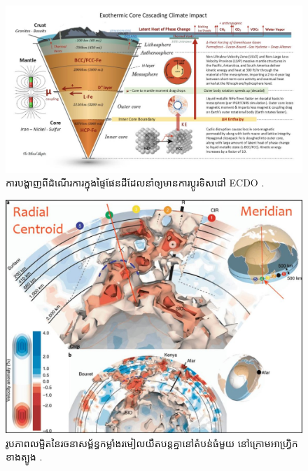 \documentclass[10pt,twocolumn,letterpaper]{article}
\begin{document}
\begin{figure}[t]
\begin{center}
\includegraphics[width=1\textwidth]{layers.jpg}
\end{center}
   \caption{ការបង្ហាញពីដំណើរការ​ក្នុងផ្ទៃផែនដី​ដែលនាំឲ្យមានការប្ដូរទិសដៅ ECDO \cite{129}.}
\label{fig:11}
\end{figure}


\begin{figure}[t]
\begin{center}
   \includegraphics[width=1\linewidth]{llvp.jpg}
\end{center}
   \caption{រូបភាពលម្អិតនៃរចនាសម្ព័ន្ធកម្លាំងរមៀលយឺតបន្តគ្នានៅតំបន់ធំមួយ នៅក្រោមអាហ្វ្រិកខាងត្បូង \cite{28}.}
\label{fig:12}
\label{fig:onecol}
\end{figure}
\end{document}
